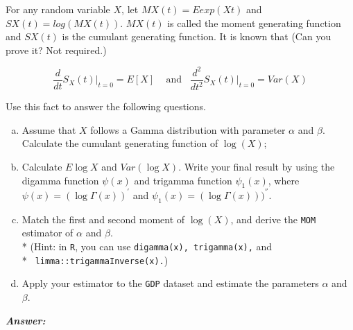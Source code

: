 \documentclass[12pt]{article}
\newenvironment{question}[2][Question]{\begin{trivlist}
\item[\hskip \labelsep {\bfseries #1}\hskip \labelsep {\bfseries #2.}]}{\end{trivlist}}
\begin{document}
\bigskip
\bigskip
\begin{question}{3.4}For any random variable $X$, let $MX(t) = E exp(Xt)$ and $SX(t) = log(MX(t))$. $MX(t)$ is called 
the moment generating function and $SX(t)$ is the cumulant generating function. It is known that (Can you prove it? Not required.)

\begin{center}
$$
\frac{d}{dt} S_X(t) \Big|_{t=0} = E[X] \;\;\; \text{ and} \;\;\; \frac{d^2}{dt^2} S_X(t) \Big|_{t=0} = Var(X) 
$$
\end{center}

Use this fact to answer the following questions.

\begin{enumerate}[(a)]

   \item Assume that $X$ follows a Gamma distribution with parameter $\alpha$ and $\beta$. Calculate the cumulant generating function of $\log (X)$;
   \item Calculate $E \log X$  and $Var(\log X)$. Write your final result by using the digamma function  $\psi (x) $
and trigamma function  $\psi_1 (x) $, where  $\psi (x) = (\log \Gamma(x))^{'}$ and  $\psi_1 (x) = (\log \Gamma(x)))^{''}$.
   \item Match the first and second moment of $\log(X)$, and derive the \texttt{MOM} estimator of $\alpha$ and $\beta$. \\*
(Hint: in \texttt{R}, you can use \texttt{digamma(x), trigamma(x),} and \\* \texttt{ limma::trigammaInverse(x).})

   \item Apply your estimator to the \texttt{GDP} dataset and estimate the parameters $\alpha$  and $\beta$.


\end{enumerate}


\end{question}

 \textbf{\color{TealBlue}\emph{Answer:} } 




 
\end{document}
